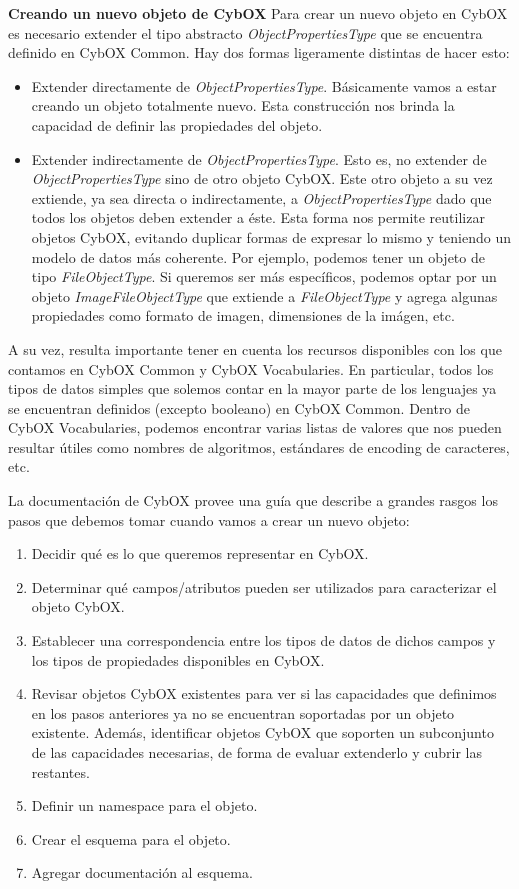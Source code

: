 \textbf{Creando un nuevo objeto de CybOX} \newline
Para crear un nuevo objeto en CybOX es necesario extender el tipo abstracto \emph{ObjectPropertiesType} que se encuentra definido en CybOX Common. Hay dos formas ligeramente distintas de hacer esto:

\begin{itemize}
\item Extender directamente de \emph{ObjectPropertiesType}. Básicamente vamos a estar creando un objeto totalmente nuevo. Esta construcción nos brinda la capacidad de definir las propiedades del objeto.
\item Extender indirectamente de \emph{ObjectPropertiesType}. Esto es, no extender de \emph{ObjectPropertiesType} sino de otro objeto CybOX. Este otro objeto a su vez extiende, ya sea directa o indirectamente, a \emph{ObjectPropertiesType} dado que todos los objetos deben extender a éste.
Esta forma nos permite reutilizar objetos CybOX, evitando duplicar formas de expresar lo mismo y teniendo un modelo de datos más coherente.
Por ejemplo, podemos tener un objeto de tipo \emph{FileObjectType}. Si queremos ser más específicos, podemos optar por un objeto \emph{ImageFileObjectType} que extiende a \emph{FileObjectType} y agrega algunas propiedades como formato de imagen, dimensiones de la imágen, etc.
\end{itemize}

A su vez, resulta importante tener en cuenta los recursos disponibles con los que contamos en CybOX Common y CybOX Vocabularies. En particular, todos los tipos de datos simples que solemos contar en la mayor parte de los lenguajes ya se encuentran definidos (excepto booleano) en CybOX Common. Dentro de CybOX Vocabularies, podemos encontrar varias listas de valores que nos pueden resultar útiles como nombres de algoritmos, estándares de encoding de caracteres, etc.

La documentación de CybOX \cite{cyboxGitHub} provee una guía que describe a grandes rasgos los pasos que debemos tomar cuando vamos a crear un nuevo objeto:

\begin{enumerate}[topsep=0pt, parsep=0pt, partopsep=0pt]
\item Decidir qué es lo que queremos representar en CybOX.
\item Determinar qué campos/atributos pueden ser utilizados para caracterizar el objeto CybOX.
\item Establecer una correspondencia entre los tipos de datos de dichos campos y los tipos de propiedades disponibles en CybOX.
\item Revisar objetos CybOX existentes para ver si las capacidades que definimos en los pasos anteriores ya no se encuentran soportadas por un objeto existente. Además, identificar objetos CybOX que soporten un subconjunto de las capacidades necesarias, de forma de evaluar extenderlo y cubrir las restantes.
\item Definir un namespace para el objeto.
\item Crear el esquema para el objeto.
\item Agregar documentación al esquema.
\end{enumerate}

